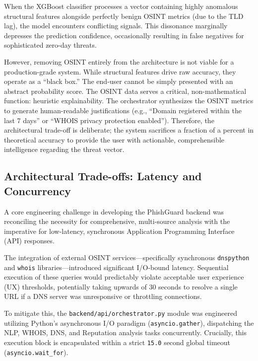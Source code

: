 When the XGBoost classifier processes a vector containing highly
anomalous structural features alongside perfectly benign OSINT metrics
(due to the TLD lag), the model encounters conflicting signals. This
dissonance marginally depresses the prediction confidence, occasionally
resulting in false negatives for sophisticated zero-day threats.

However, removing OSINT entirely from the architecture is not viable for
a production-grade system. While structural features drive raw accuracy,
they operate as a ``black box.'' The end-user cannot be simply presented
with an abstract probability score. The OSINT data serves a critical,
non-mathematical function: heuristic explainability. The orchestrator
synthesizes the OSINT metrics to generate human-readable justifications
(e.g., ``Domain registered within the last 7 days'' or ``WHOIS privacy
protection enabled''). Therefore, the architectural trade-off is
deliberate; the system sacrifices a fraction of a percent in theoretical
accuracy to provide the user with actionable, comprehensible
intelligence regarding the threat vector.

\subsection{Architectural Trade-offs: Latency and
Concurrency}\label{architectural-trade-offs-latency-and-concurrency}

A core engineering challenge in developing the PhishGuard backend was
reconciling the necessity for comprehensive, multi-source analysis with
the imperative for low-latency, synchronous Application Programming
Interface (API) responses.

The integration of external OSINT services---specifically synchronous
\texttt{dnspython} and \texttt{whois} libraries---introduced significant
I/O-bound latency. Sequential execution of these queries would
predictably violate acceptable user experience (UX) thresholds,
potentially taking upwards of 30 seconds to resolve a single URL if a
DNS server was unresponsive or throttling connections.

To mitigate this, the \texttt{backend/api/orchestrator.py} module was
engineered utilizing Python's asynchronous I/O paradigm
(\texttt{asyncio.gather}), dispatching the NLP, WHOIS, DNS, and
Reputation analysis tasks concurrently. Crucially, this execution block
is encapsulated within a strict \texttt{15.0} second global timeout
(\texttt{asyncio.wait\_for}).

